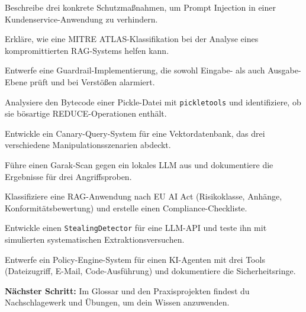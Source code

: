 \begin{uebungen}
    \item Beschreibe drei konkrete Schutzmaßnahmen, um Prompt Injection in einer Kundenservice-Anwendung zu verhindern.
    \item Erkläre, wie eine MITRE ATLAS-Klassifikation bei der Analyse eines kompromittierten RAG-Systems helfen kann.
    \item Entwerfe eine Guardrail-Implementierung, die sowohl Eingabe- als auch Ausgabe-Ebene prüft und bei Verstößen alarmiert.
    \item Analysiere den Bytecode einer Pickle-Datei mit \texttt{pickletools} und identifiziere, ob sie bösartige REDUCE-Operationen enthält.
    \item Entwickle ein Canary-Query-System für eine Vektordatenbank, das drei verschiedene Manipulationsszenarien abdeckt.
    \item Führe einen Garak-Scan gegen ein lokales LLM aus und dokumentiere die Ergebnisse für drei Angriffsproben.
    \item Klassifiziere eine RAG-Anwendung nach EU AI Act (Risikoklasse, Anhänge, Konformitätsbewertung) und erstelle einen Compliance-Checkliste.
    \item Entwickle einen \texttt{StealingDetector} für eine LLM-API und teste ihn mit simulierten systematischen Extraktionsversuchen.
    \item Entwerfe ein Policy-Engine-System für einen KI-Agenten mit drei Tools (Dateizugriff, E-Mail, Code-Ausführung) und dokumentiere die Sicherheitsringe.
\end{uebungen}

\textbf{Nächster Schritt:} Im Glossar und den Praxisprojekten findest du Nachschlagewerk und Übungen, um dein Wissen anzuwenden.
